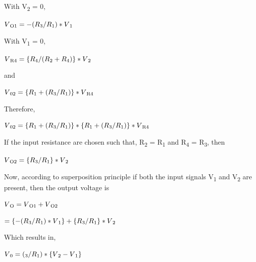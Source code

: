 \documentclass[11pt,a4paper,oneside]{article}
\begin{document}
With V\textsubscript{2} = 0,

\begin{center}
$V\textsubscript{O1} = -(R\textsubscript{3}/R\textsubscript{1})*V\textsubscript{1}$
\end{center}

With V\textsubscript{1} = 0,

\begin{center}
$V\textsubscript{R4} = \{R\textsubscript{4}/(R\textsubscript{2}+R\textsubscript{4})\}*V\textsubscript{2}$
\end{center}

\begin{center}
	and
\end{center}

\begin{center}
$V\textsubscript{02} = \{R\textsubscript{1}+(R\textsubscript{3}/R\textsubscript{1})\}*V\textsubscript{R4}$
\end{center}

Therefore,

\begin{center}
$V\textsubscript{02} = \{R\textsubscript{1}+(R\textsubscript{3}/R\textsubscript{1})\}*\{R\textsubscript{1}+(R\textsubscript{3}/R\textsubscript{1})\}*V\textsubscript{R4}$
\end{center}

If the input resistance are chosen such that, R\textsubscript{2} = R\textsubscript{1} and R\textsubscript{4} = R\textsubscript{3}, then

\begin{center}
$V\textsubscript{O2} = \{R\textsubscript{3}/R\textsubscript{1}\}*V\textsubscript{2}$
\end{center}

Now, according to superposition principle if both the input signals V\textsubscript{1} and V\textsubscript{2} are present, then the output voltage is

\begin{center}
$V\textsubscript{O} = V\textsubscript{O1} + V\textsubscript{O2}$
\end{center}

\begin{center}
$=\{-(R\textsubscript{3}/R\textsubscript{1}) * V\textsubscript{1}\} + \{R\textsubscript{3}/R\textsubscript{1}\}*V\textsubscript{2}$
\end{center}

Which results in,

\begin{center}
$V\textsubscript{0} = (\textsubscript{3}/R\textsubscript{1}) * \{V\textsubscript{2} - V\textsubscript{1}\}$
\end{center}
\end{document}
